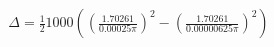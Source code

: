 \documentclass[preview]{standalone}
\begin{document}
\begin{align*}
\Delta  = \frac{1}{2} 1000 ((\frac{1.70261}{0.00025\pi})^2 - (\frac{1.70261}{0.00000625\pi})^2)
\end{align*}
\end{document}
